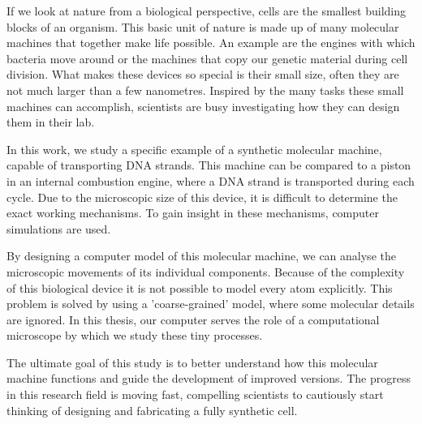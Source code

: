 If we look at nature from a biological perspective, cells are the smallest building
blocks of an organism. This basic unit of nature is made up of many molecular
machines that together make life possible. An example are the engines with which
bacteria move around or the machines that copy our genetic material during cell division.
What makes these devices so special is their small size, often they are not much
larger than a few nanometres. Inspired by the many tasks these small machines
can accomplish, scientists are busy investigating how they can design them in their lab.

In this work, we study a specific example of a synthetic molecular
machine, capable of transporting DNA strands. This machine can be compared to a piston
in an internal combustion engine, where a DNA strand is transported during each cycle.
Due to the microscopic size of this device, it is difficult to determine the exact
working mechanisms. To gain insight in these mechanisms, computer simulations are
used.

By designing a computer model of this molecular machine, we can
analyse the microscopic movements of its individual components. Because of the complexity
of this biological device it is not possible to model every atom explicitly.
This problem is solved by using a 'coarse-grained' model, where
some molecular details are ignored. In this thesis, our computer serves the role of a
computational microscope by which we study these tiny processes.

The ultimate goal of this study is to better understand how this molecular machine
functions and guide the development of improved versions. The progress in this
research field is moving fast, compelling scientists to cautiously start thinking of
designing and fabricating a fully synthetic cell.

